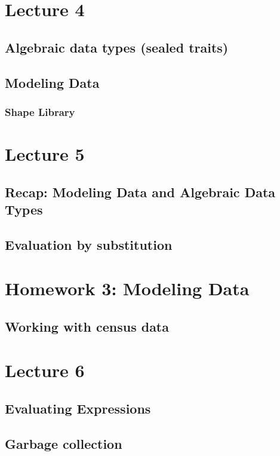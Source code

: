 \documentclass{book}
\begin{document}
\chapter{Lecture 4}

\section{Algebraic data types (sealed traits)}

\section{Modeling Data}

\subsection{Shape Library}

\chapter{Lecture 5}

\section{Recap: Modeling Data and Algebraic Data Types}

\section{Evaluation by substitution}

\chapter{Homework 3: Modeling Data}

\section{Working with census data}

\chapter{Lecture 6}

\section{Evaluating Expressions}

\section{Garbage collection}
\end{document}
